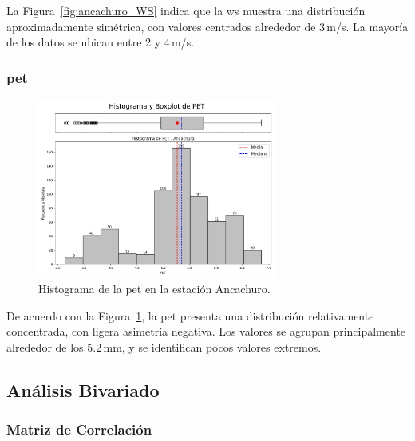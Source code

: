 La Figura~\ref{fig:ancachuro_WS} indica que la \gls{ws} muestra una distribución aproximadamente simétrica, con valores centrados alrededor de 3\,\si{m/s}. La mayoría de los datos se ubican entre 2 y 4\,\si{m/s}.

\subsubsection*{\gls{pet}}

\begin{figure}[htbp]
\centering
\includegraphics[width=0.7\textwidth]{resultados/por_estacion_meteorologica/Ancachuro/PET_histograma.png}
\caption{Histograma de la \gls{pet} en la estación Ancachuro.}
\label{fig:ancachuro_PET}
\end{figure}

De acuerdo con la Figura~\ref{fig:ancachuro_PET}, la \gls{pet} presenta una distribución relativamente concentrada, con ligera asimetría negativa. Los valores se agrupan principalmente alrededor de los 5.2\,mm, y se identifican pocos valores extremos.



\subsection{Análisis Bivariado}

\subsubsection*{Matriz de Correlación}

